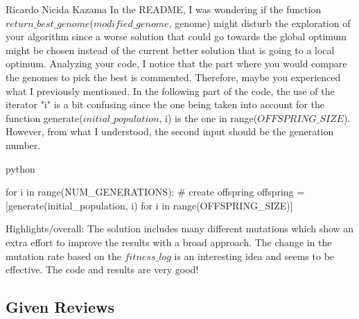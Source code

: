 \begin{tcolorbox}[colback=green!5!white,colframe=green!75!black,code={\singlespacing}]
   Ricardo Nicida Kazama
\tcblower
In the README, I was wondering if the function $return\_best\_genome$($modified\_genome$, genome) might disturb the exploration of your algorithm since a worse solution that could go towards the global optimum might be chosen instead of the current better solution that is going to a local optimum. Analyzing your code, I notice that the part where you would compare the genomes to pick the best is commented. Therefore, maybe you experienced what I previously mentioned.
In the following part of the code, the use of the iterator "i" is a bit confusing since the one being taken into account for the function generate($initial\_population$, i) is the one in range($OFFSPRING\_SIZE$). However, from what I understood, the second input should be the generation number.

\begin{mintedbox}{python}

for i in range(NUM_GENERATIONS):
    # create offspring
    offspring = [generate(initial_population, i) for i in range(OFFSPRING_SIZE)]
\end{mintedbox}

Highlights/overall:
The solution includes many different mutations which show an extra effort to improve the results with a broad approach.
The change in the mutation rate based on the $fitness\_log$ is an interesting idea and seems to be effective.
The code and results are very good!
\end{tcolorbox}

\subsection{Given Reviews}